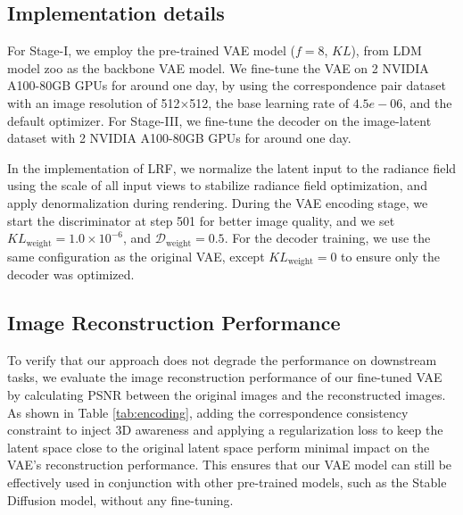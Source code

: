 \subsection{Implementation details}
\label{subsec: imple details}
For Stage-I, we employ the pre-trained VAE model ($f=8$, $KL$), from LDM model zoo as the backbone VAE model. We fine-tune the VAE on 2 NVIDIA A100-80GB GPUs for around one day, by using the correspondence pair dataset with an image resolution of 512$\times$512, the base learning rate of ${4.5e-06}$, and the default optimizer. For Stage-III, we fine-tune the decoder on the image-latent dataset with 2 NVIDIA A100-80GB GPUs for around one day. 

In the implementation of LRF, we normalize the latent input to the radiance field using the scale of all input views to stabilize radiance field optimization, and apply denormalization during rendering. During the VAE encoding stage, we start the discriminator at step 501 for better image quality, and we set $KL_{\text{weight}} = 1.0 \times 10^{-6}$, and $\mathcal{D}_{\text{weight}} = 0.5$. For the decoder training, we use the same configuration as the original VAE, except $KL_{\text{weight}} = 0$ to ensure only the decoder was optimized.

\subsection{Image Reconstruction Performance}
To verify that our approach does not degrade the performance on downstream tasks, we evaluate the image reconstruction performance of our fine-tuned VAE by calculating PSNR between the original images and the reconstructed images. As shown in Table \ref{tab:encoding}, adding the correspondence consistency constraint to inject 3D awareness and applying a regularization loss to keep the latent space close to the original latent space perform minimal impact on the VAE's reconstruction performance. This ensures that our VAE model can still be effectively used in conjunction with other pre-trained models, such as the Stable Diffusion model, without any fine-tuning. 

\begin{table*}[h]
\centering
\caption{Evaluation of PSNR for images reconstructed by VAEs on NeRF-LLFF, DL3DV-10K, and Mip-NeRF360 datasets.}
\vspace{-1em}
\label{tab:encoding}
\end{table*}

